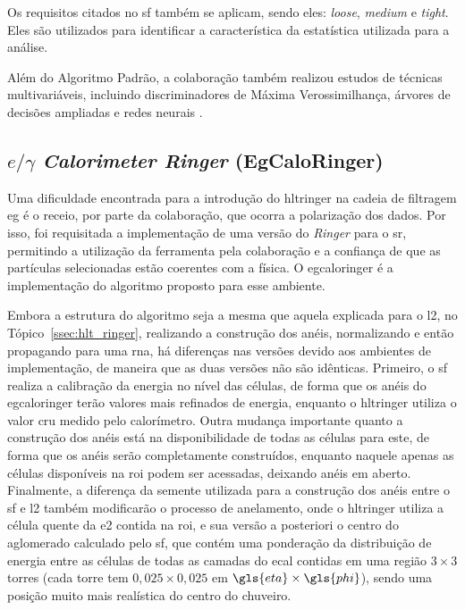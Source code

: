 Os requisitos citados no \gls{sf} também se aplicam, sendo eles: \emph{loose}, 
\emph{medium} e \emph{tight}. Eles são utilizados para
identificar a característica da estatística utilizada para a análise.

Além do Algoritmo Padrão, a colaboração também realizou estudos de técnicas
multivariáveis, incluindo discriminadores de Máxima Verossimilhança, árvores 
de decisões ampliadas e redes neurais \cite{physics_perf_expected}.


\subsection{\texorpdfstring{$e/\gamma$ \emph{Calorimeter Ringer}
(EgCaloRinger)}{eGamma Calorimeter Ringer (EgCaloRinger)}}
\label{ssec:egringer}

Uma dificuldade encontrada para a introdução do \gls{hltringer} na cadeia de
filtragem \gls{eg} é o receio, por parte da colaboração, que ocorra a polarização dos dados. 
Por isso, foi requisitada a implementação de uma versão do \emph{Ringer} para o \gls{sr}, permitindo
a utilização da ferramenta pela colaboração e a confiança de que as partículas
selecionadas estão coerentes com a física. O \gls{egcaloringer} é a
implementação do algoritmo proposto para esse ambiente.

Embora a estrutura do algoritmo seja a mesma que aquela explicada para o \gls{l2}, no
Tópico~\ref{ssec:hlt_ringer}, realizando a construção dos anéis, normalizando e
então propagando para uma \gls{rna}, há diferenças nas versões devido aos ambientes de implementação, 
de maneira que as duas versões não são idênticas. Primeiro, o \gls{sf} realiza a calibração da energia 
no nível das células, de forma que os anéis do \gls{egcaloringer} terão 
valores mais refinados de energia, enquanto o \gls{hltringer} utiliza o
valor cru medido pelo calorímetro. Outra mudança importante quanto a construção
dos anéis está na disponibilidade de todas as células para este, de forma que
os anéis serão completamente construídos, enquanto naquele apenas as
células disponíveis na \gls{roi} podem ser acessadas, deixando anéis em aberto. 
Finalmente, a diferença da semente utilizada para a construção dos anéis entre o \gls{sf} e \gls{l2}
também modificarão o processo de anelamento, onde o \gls{hltringer} utiliza
a célula quente da \gls{e2} contida na \gls{roi}, e sua versão a
posteriori o centro do aglomerado calculado pelo \gls{sf}, que contém uma ponderação da
distribuição de energia entre as células de todas as camadas do \gls{ecal}
contidas em uma região $3\times3$ torres (cada torre tem $0,025\times0,025$ em
$\gls{eta}\times\gls{phi}$), sendo uma posição muito mais realística 
do centro do chuveiro.


